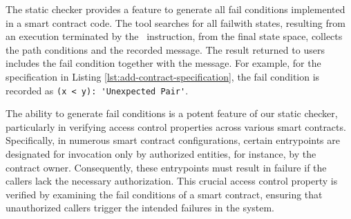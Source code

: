 \documentclass[a4paper,USenglish,cleveref, autoref, thm-restate]{lipics-v2021}
\begin{document}
The static checker provides a feature to generate all fail conditions
implemented in a smart contract code. The tool searches for all
failwith states, resulting from an execution terminated by the
\FAILWITH\ instruction, from the final state space, collects the path
conditions and the recorded message. The result returned to users
includes the fail condition together with the message. For example,
for the specification in Listing \ref{lst:add-contract-specification},
the fail condition is recorded as
\lstinline/(x < y): 'Unexpected Pair'/.  

The ability to generate fail conditions is a potent feature of our
static checker, particularly in verifying access control properties
across various smart contracts. Specifically, in numerous smart
contract configurations, certain entrypoints are designated for
invocation only by authorized entities, for instance, by the contract
owner. Consequently, these entrypoints must result in failure if the
callers lack the necessary authorization. This crucial access control
property is verified by examining the fail conditions of a smart
contract, ensuring that unauthorized callers trigger the intended
failures in the system. 
\end{document}
